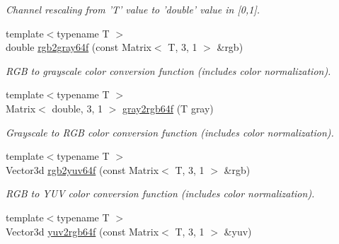 \begin{DoxyCompactItemize}
\begin{DoxyCompactList}\small\item\em Channel rescaling from 'T' value to 'double' value in \mbox{[}0,1\mbox{]}. \end{DoxyCompactList}\item 
\hypertarget{group___color_conversion_ga04155a327ff725c0466e90ee1bdb6ecd}{{\footnotesize template$<$typename T $>$ }\\double \hyperlink{group___color_conversion_ga04155a327ff725c0466e90ee1bdb6ecd}{rgb2gray64f} (const Matrix$<$ T, 3, 1 $>$ \&rgb)}\label{group___color_conversion_ga04155a327ff725c0466e90ee1bdb6ecd}

\begin{DoxyCompactList}\small\item\em R\-G\-B to grayscale color conversion function (includes color normalization). \end{DoxyCompactList}\item 
\hypertarget{group___color_conversion_gaa88c55b9890d4ec25b7318fb12dbae6a}{{\footnotesize template$<$typename T $>$ }\\Matrix$<$ double, 3, 1 $>$ \hyperlink{group___color_conversion_gaa88c55b9890d4ec25b7318fb12dbae6a}{gray2rgb64f} (T gray)}\label{group___color_conversion_gaa88c55b9890d4ec25b7318fb12dbae6a}

\begin{DoxyCompactList}\small\item\em Grayscale to R\-G\-B color conversion function (includes color normalization). \end{DoxyCompactList}\item 
\hypertarget{group___color_conversion_gab873008f62a65b63fea0ff868104b43c}{{\footnotesize template$<$typename T $>$ }\\Vector3d \hyperlink{group___color_conversion_gab873008f62a65b63fea0ff868104b43c}{rgb2yuv64f} (const Matrix$<$ T, 3, 1 $>$ \&rgb)}\label{group___color_conversion_gab873008f62a65b63fea0ff868104b43c}

\begin{DoxyCompactList}\small\item\em R\-G\-B to Y\-U\-V color conversion function (includes color normalization). \end{DoxyCompactList}\item 
\hypertarget{group___color_conversion_ga410f9201d95ba7b01b003cf9636e5011}{{\footnotesize template$<$typename T $>$ }\\Vector3d \hyperlink{group___color_conversion_ga410f9201d95ba7b01b003cf9636e5011}{yuv2rgb64f} (const Matrix$<$ T, 3, 1 $>$ \&yuv)}\label{group___color_conversion_ga410f9201d95ba7b01b003cf9636e5011}


\end{DoxyCompactItemize}
